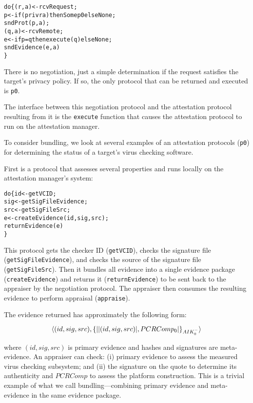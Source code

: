 \documentclass[10pt]{article}
\begin{document}
\begin{alltt}
  do \{ (r,a) <- rcvRequest;
       p <- if (priv r a) then Some p0 else None;
       sndProt(p,a);
       (q,a) <- rcvRemote;
       e <- if p=q then execute(q) else None;
       sndEvidence(e,a)
  \}
\end{alltt}

There is no negotiation, just a simple determination if the request
satisfies the target's privacy policy.  If so, the only protocol that
can be returned and executed is \Verb+p0+.

The interface between this negotiation protocol and the attestation
protocol resulting from it is the \Verb+execute+ function that causes
the attestation protocol to run on the attestation manager.

To consider bundling, we look at several examples of an attestation
protocols (\Verb+p0+) for determining the status of a target's virus
checking software.

First is a protocol that assesses several properties and runs locally
on the attestation manager's system:

\begin{alltt}
  do \{ id <- getVCID;
       sig <- getSigFileEvidence;
       src <- getSigFileSrc;
       e <- createEvidence(id,sig,src);
       returnEvidence(e)
  \}
\end{alltt}

This protocol gets the checker ID (\Verb+getVCID+), checks the
signature file (\Verb+getSigFileEvidence+), and checks the source of
the signature file (\Verb+getSigFileSrc+). Then it bundles all
evidence into a single evidence package (\Verb+createEvidence+) and
returns it (\Verb+returnEvidence+) to be sent back to the appraiser by
the negotiation protocol.  The appraiser then consumes the resulting
evidence to perform appraisal (\Verb+appraise+).

The evidence returned has approximately the following form:

\[\langle (id,sig,src),\{\lvert \lvert (id,sig,src) \rvert,PCRComp_0\rvert\}_{AIK_0^{-}}\rangle\]

where $(id,sig,src)$ is primary evidence and hashes and signatures are
meta-evidence.  An appraiser can check: (i) primary evidence to assess
the measured virus checking subsystem; and (ii) the signature on the
quote to determine its authenticity and $PCRComp$ to assess the
platform construction.  This is a trivial example of what we call
bundling---combining primary evidence and meta-evidence in the same
evidence package.
\end{document}
